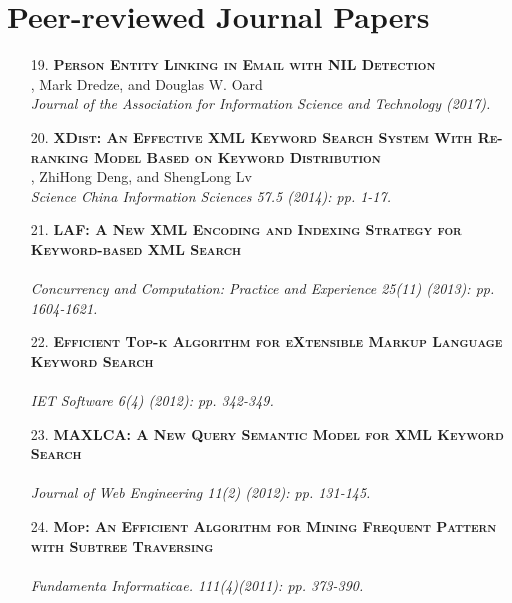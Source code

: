 \documentclass[a4paper, 11pt]{article}
\begin{document}
\section{Peer-reviewed Journal Papers}
\begin{itemize}

\item[\color{bl3} 19.]{\scshape\color{bl3}\bf Person Entity Linking in Email with NIL Detection}\\
, Mark Dredze, and Douglas W. Oard\\
\emph{Journal of the Association for Information Science and Technology (2017).}
\vspace{2mm}

\item[\color{bl3} 20.]{\scshape\color{bl3}\bf XDist: An Effective XML Keyword Search System With Re-ranking Model Based on Keyword Distribution}\\
, ZhiHong Deng, and ShengLong Lv\\
\emph{Science China Information Sciences 57.5 (2014): pp. 1-17.}
\vspace{2mm}

\item[\color{bl3} 21.]{\scshape\color{bl3}\bf  LAF: A New XML Encoding and Indexing Strategy for Keyword-based XML Search}\\
\\
\emph{ Concurrency and Computation: Practice and Experience 25(11) (2013): pp. 1604-1621.}
\vspace{2mm}

\item[\color{bl3} 22.]{\scshape\color{bl3}\bf  Efficient Top-k Algorithm for eXtensible Markup Language Keyword Search}\\
\\
\emph{IET Software 6(4) (2012): pp. 342-349.}
\vspace{2mm}

\item[\color{bl3} 23.]{\scshape\color{bl3}\bf MAXLCA: A New Query Semantic Model for XML Keyword Search}\\
\\
\emph{Journal of Web Engineering 11(2) (2012): pp. 131-145.}
\vspace{2mm}

\item[\color{bl3} 24.]{\scshape\color{bl3}\bf Mop: An Efficient Algorithm for Mining Frequent Pattern with Subtree Traversing}\\
\\
\emph{ Fundamenta Informaticae. 111(4)(2011): pp. 373-390.}
\vspace{2mm}


\end{itemize}
\end{document}
